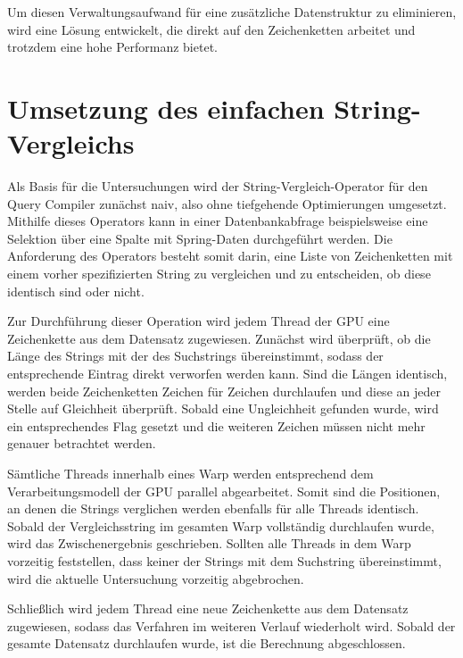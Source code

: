 Um diesen Verwaltungsaufwand für eine zusätzliche Datenstruktur zu eliminieren, wird eine Lösung entwickelt, die direkt auf den Zeichenketten arbeitet und trotzdem eine hohe Performanz bietet.

\section{Umsetzung des einfachen String-Vergleichs}
\label{sec:equals_umsetzung}

Als Basis für die Untersuchungen wird der String-Vergleich-Operator für den Query Compiler zunächst naiv, also ohne tiefgehende Optimierungen umgesetzt.
Mithilfe dieses Operators kann in einer Datenbankabfrage beispielsweise eine Selektion über eine Spalte mit Spring-Daten durchgeführt werden.
Die Anforderung des Operators besteht somit darin, eine Liste von Zeichenketten mit einem vorher spezifizierten String zu vergleichen und zu entscheiden, ob diese identisch sind oder nicht.

Zur Durchführung dieser Operation wird jedem Thread der GPU eine Zeichenkette aus dem Datensatz zugewiesen.
Zunächst wird überprüft, ob die Länge des Strings mit der des Suchstrings übereinstimmt, sodass der entsprechende Eintrag direkt verworfen werden kann.
Sind die Längen identisch, werden beide Zeichenketten Zeichen für Zeichen durchlaufen und diese an jeder Stelle auf Gleichheit überprüft.
Sobald eine Ungleichheit gefunden wurde, wird ein entsprechendes Flag gesetzt und die weiteren Zeichen müssen nicht mehr genauer betrachtet werden.

Sämtliche Threads innerhalb eines Warp werden entsprechend dem Verarbeitungsmodell der GPU parallel abgearbeitet.
Somit sind die Positionen, an denen die Strings verglichen werden ebenfalls für alle Threads identisch.
Sobald der Vergleichsstring im gesamten Warp vollständig durchlaufen wurde, wird das Zwischenergebnis geschrieben.
Sollten alle Threads in dem Warp vorzeitig feststellen, dass keiner der Strings mit dem Suchstring übereinstimmt, wird die aktuelle Untersuchung vorzeitig abgebrochen.

Schließlich wird jedem Thread eine neue Zeichenkette aus dem Datensatz zugewiesen, sodass das Verfahren im weiteren Verlauf wiederholt wird.
Sobald der gesamte Datensatz durchlaufen wurde, ist die Berechnung abgeschlossen.


